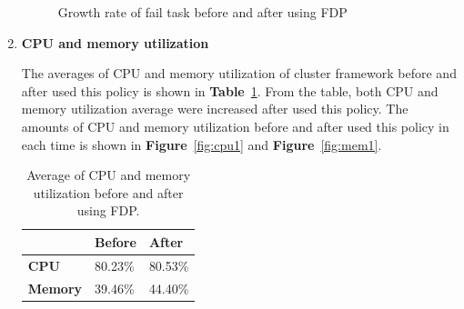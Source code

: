 \documentclass[12pt,oneside,openright,a4paper]{cpe-english-project}
\begin{document}
\begin{enumerate}
\begin{figure}[!h]\centering
    \setlength{\fboxrule}{0mm} %
    \setlength{\fboxsep}{0cm}
    \caption{Growth rate of fail task before and after using FDP}\label{fig:fail1}
\end{figure}

\newpage
  \item \textbf{CPU and memory utilization}

\hspace{10mm}The averages of CPU and memory utilization of cluster framework before and after used this policy is shown in \textbf{Table}~\ref{tbl:po1CPUMem}. From the table, both CPU and memory utilization average were increased after used this policy. The amounts of CPU and memory utilization before and after used this policy in each time is shown in \textbf{Figure}~\ref{fig:cpu1} and \textbf{Figure}~\ref{fig:mem1}. 
  
  \begin{table}[!h]
  \caption{Average of CPU and memory utilization before and after using FDP.}\label{tbl:po1CPUMem}
  \begin{tabular}{@{}|p{}|p{}|p{}|}
   \hline
   \textbf{} & \textbf{Before} & \textbf{After} \\ 
   \hline
   \textbf{CPU} & 80.23\% & 80.53\% \\ 
   \hline
   \textbf{Memory} & 39.46\% & 44.40\% \\ 
   \hline                     
  \end{tabular}
\end{table}


\end{enumerate}
\end{document}
